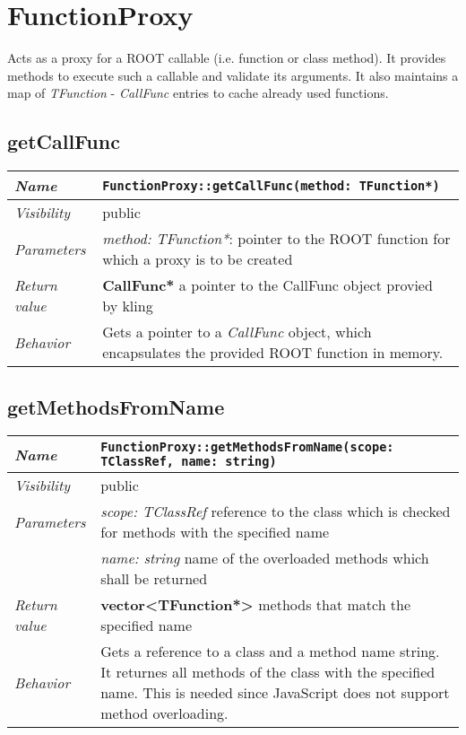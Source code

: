 \chapter{FunctionProxy}
	Acts as a proxy for a ROOT callable (i.e. function or class method). It provides methods to execute such a callable and validate its arguments. It also maintains a map of \textit{TFunction} - \textit{CallFunc} entries to cache already used functions.

\section{getCallFunc}
\begin{longtable}{p{3cm} @{\hskip 1cm} p{12cm}}
	\hline

	\textit{Name} & \texttt{FunctionProxy::getCallFunc(method: TFunction*)}\\
	\hline

	\textit{Visibility} & public\\
	\hline

	\textit{Parameters} &  \textit{method: TFunction*}: pointer to the ROOT function for which a proxy 
							is to be created\\
	\hline

	\textit{Return value} & \textbf{CallFunc*} a pointer to the CallFunc object provied by kling\\
	\hline

	\textit{Behavior} & Gets a pointer to a \textit{CallFunc} object, which encapsulates the provided ROOT function in memory.\\
	\hline

\end{longtable} \pagebreak

\section{getMethodsFromName}
\begin{longtable}{p{3cm} @{\hskip 1cm} p{12cm}}
	\hline

	\textit{Name} & \texttt{FunctionProxy::getMethodsFromName(scope: TClassRef, name: string)}\\
	\hline

	\textit{Visibility} & public\\
	\hline

	\textit{Parameters} & \textit{scope: TClassRef} reference to the class which is checked for methods with the specified name\\
		& \textit{name: string} name of the overloaded methods which shall be returned\\
	\hline

	\textit{Return value} & \textbf{vector<TFunction*>} methods that match the specified name\\
	\hline

	\textit{Behavior} & Gets a reference to a class and a method name string. It returnes all methods of the class with the specified name. This is needed since JavaScript does not support method overloading.\\
	\hline

\end{longtable}
\pagebreak

